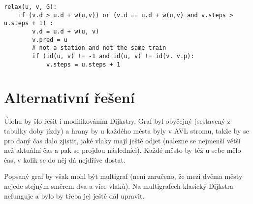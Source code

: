 \documentclass[a4paper]{article}
\begin{document}
\begin{lstlisting}
relax(u, v, G):
	if (v.d > u.d + w(u,v)) or (v.d == u.d + w(u,v) and v.steps > u.steps + 1) :
		v.d = u.d + w(u, v)
		v.pred = u
		# not a station and not the same train
		if (id(u, v) != -1 and id(u, v) != id(v. v.p):
			v.steps = u.steps + 1
\end{lstlisting}

\section{Alternativní řešení}
Úlohu by šlo řešit i modifikováním Dijkstry. Graf byl obyčejný (sestavený z tabulky doby jízdy) a hrany by u každého města byly v AVL stromu, takže by se pro daný čas dalo zjistit, jaké vlaky mají ještě odjet (nalezne se nejmenší větší než aktuální čas a pak se projdou následníci). Každé město by též u sebe mělo čas, v kolik se do něj dá nejdříve dostat.

Popsaný graf by však mohl být multigraf (není zaručeno, že mezi dvěma městy nejede stejným směrem dva a více vlaků). Na multigrafech klasický Dijkstra nefunguje a bylo by třeba jej ještě dál upravit.
\end{document}
